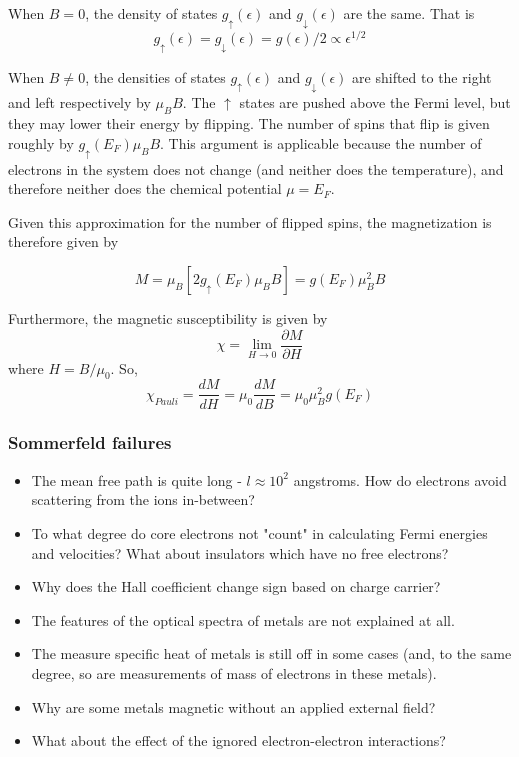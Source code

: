 \documentclass[10pt]{article}
\begin{document}
When $B = 0$, the density of states $g_{\uparrow}(\epsilon)$ and $g_{\downarrow}(\epsilon)$ are the same. That is
$$
g_{\uparrow}(\epsilon) = g_{\downarrow}(\epsilon) = g(\epsilon)/2 \propto \epsilon^{1/2}
$$

When $B \neq 0$, the densities of states $g_{\uparrow}(\epsilon)$ and $g_{\downarrow}(\epsilon)$ are shifted to the right and left
respectively by $\mu_{B}B$. The $\uparrow$ states are pushed above the Fermi level, but they may lower their energy by flipping. The number of spins that
flip is given roughly by $g_{\uparrow}(E_{F})\mu_{B}B$. This argument is applicable because the number of electrons in the system does not change (and neither does
the temperature), and therefore neither does the chemical potential $\mu = E_{F}$.

Given this approximation for the number of flipped spins, the magnetization is therefore given by

$$
M = \mu_{B}[2g_{\uparrow}(E_{F})\mu_{B}B] = g(E_{F})\mu_{B}^{2}B
$$

Furthermore, the magnetic susceptibility is given by
$$
\chi = \lim_{H \rightarrow 0}\frac{\partial M}{\partial H}
$$
where $H = B/\mu_{0}$. So,
$$
\chi_{Pauli} = \frac{dM}{dH} = \mu_{0}\frac{dM}{dB} = \mu_{0}\mu_{B}^{2}g(E_{F})
$$


\subsubsection{Sommerfeld failures}
\begin{itemize}
  \item The mean free path is quite long - $l \approx 10^{2}$ angstroms. How do electrons avoid scattering from the ions in-between?
  \item To what degree do core electrons not "count" in calculating Fermi energies and velocities? What about insulators which have no free
  electrons?
  \item Why does the Hall coefficient change sign based on charge carrier?
  \item The features of the optical spectra of metals are not explained at all.
  \item The measure specific heat of metals is still off in some cases (and, to the same degree, so are measurements of
  mass of electrons in these metals).
  \item Why are some metals magnetic without an applied external field?
  \item What about the effect of the ignored electron-electron interactions?
\end{itemize}
\end{document}
